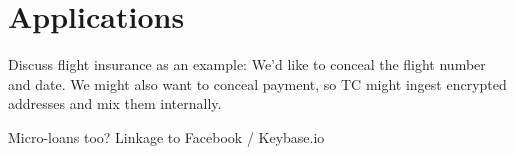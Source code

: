 \section{Applications}

Discuss flight insurance as an example: We'd like to conceal the flight number and date. We might also want to conceal payment, so TC might ingest encrypted addresses and mix them internally.

Micro-loans too? Linkage to Facebook / Keybase.io

